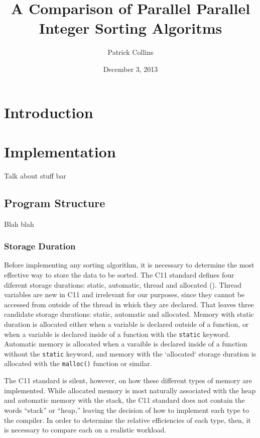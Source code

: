 \documentclass{article}
\begin{document}
\title{A Comparison of Parallel Parallel Integer Sorting Algoritms}
\author{Patrick Collins}
\date{December 3, 2013}
\maketitle


\section{Introduction}

\section{Implementation}
Talk about stuff bar

\subsection{Program Structure}
Blah blah

\subsubsection{Storage Duration}

Before implementing any sorting algorithm, it is necessary to
determine the most effective way to store the data to be
sorted. The C11 standard defines four diferent storage durations:
static, automatic, thread and allocated (\cite[\S 6.2.4]{CStd}).
Thread variables are new in C11 and irrelevant for our purposes, since they cannot be
accessed from outside of the thread in which they are declared. That
leaves three candidate storage durations: static, automatic and
allocated. Memory with static duration is allocated either when a
variable is declared outside of a
function, or when a variable is declared inside of a function with the \texttt{static}
keyword. Automatic memory is allocated when a varaible is declared
inside of a function without the \texttt{static} keyword, and memory
with the `allocated` storage duration is allocated with the
\texttt{malloc()} function or similar. \smallskip

The C11 standard is silent, however, on how these different types of
memory are implemented. While allocated memory is most naturally
associated with the heap and automatic memory with the stack, the C11
standard does not contain the words ``stack'' or ``heap,'' leaving the
decision of how to implement each type to the compiler. In order to
determine the relative efficiencies of each type, then, it is
necessary to compare each on a realistic workload.
\end{document}
